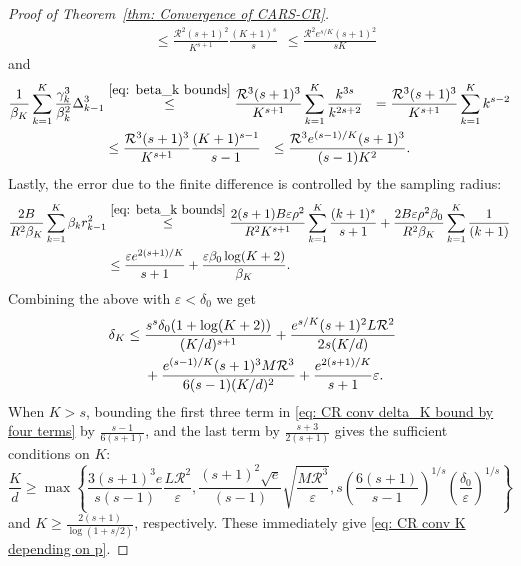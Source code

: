 \begin{proof}[Proof of Theorem~\ref{thm: Convergence of CARS-CR}]
\begin{align*}
         & \leq \frac{\mathcal{R}^2(s+1)^2}{K^{s+1}} \frac{(K+1)^s}{s}
        ~~\leq \frac{\mathcal{R}^2e^{s/K} (s+1)^2}{sK}
    \end{align*}
    and
    \begin{align*}
        \frac{1}{\beta_K}\sum_{k=1}^{K}\frac{\gamma_k^3}{\beta_k^2}\Delta_{k-1}^3
         & \stackrel{\eqref{eq: beta_k bounds}}{\leq} \frac{\mathcal{R}^3(s+1)^3}{K^{s+1}} \sum_{k=1}^{K}\frac{k^{3s}}{k^{2s+2}}
        ~~= \frac{\mathcal{R}^3(s+1)^3}{K^{s+1}} \sum_{k=1}^{K} k^{s-2}                                                                \\
         & \leq \frac{\mathcal{R}^3(s+1)^3}{K^{s+1}} \frac{(K+1)^{s-1}}{s-1} ~~\leq \frac{\mathcal{R}^3e^{(s-1)/K} (s+1)^3}{(s-1)K^2}.
    \end{align*}
    Lastly, the error due to the finite difference is controlled by the sampling radius:
    \begin{align*}
        \frac{2B}{R^2 \beta_K}\sum_{k=1}^{K}\beta_{k} r_{k-1}^2
         & \stackrel{\eqref{eq: beta_k bounds}}{\leq} \frac{2(s+1) B\varepsilon \rho^2}{R^2 K^{s+1}} \sum_{k=1}^{K}\frac{(k+1)^{s}}{s+1} + \frac{2B\varepsilon \rho^2 \beta_0}{R^2 \beta_K}\sum_{k=1}^{K} \frac{1}{(k+1)} \\
         & \leq \frac{\varepsilon e^{2(s+1)/K}}{s+1} + \frac{\varepsilon \beta_0 \log(K+2)}{\beta_K}.
    \end{align*}
    Combining the above with $\varepsilon < \delta_0$ we get
    \begin{align}\label{eq: CR conv delta_K bound by four terms}
        \delta_K & \leq \frac{ s^s \delta_0 (1+ \log(K+2)) }{(K/d)^{s+1}}
        + \frac{e^{s/K} (s+1)^2 L\mathcal{R}^2  }{2s(K/d)} \cr
                 & \quad~ + \frac{e^{(s-1)/K} (s+1)^3 M \mathcal{R}^3  }{6(s-1)(K/d)^2}
        + \frac{e^{2(s+1)/K} }{s+1}\varepsilon .
    \end{align}
    When $K>s$, bounding the first three term in \eqref{eq: CR conv delta_K bound by four terms} by $\frac{s-1}{6(s+1)}$, and the last term by $\frac{s+3}{2(s+1)}$ gives the sufficient conditions on $K$:
    \begin{equation*}
        \frac{K}{d} \geq \max\left\{
        \frac{3(s+1)^3 e}{s(s-1)}\frac{L\mathcal{R}^2}{\varepsilon},
        \frac{(s+1)^2 \sqrt{e}}{(s-1)} \sqrt{\frac{M\mathcal{R}^3}{\varepsilon}},
        s\left(\frac{6(s+1)}{s-1}\right)^{1/s} \left(\frac{\delta_0}{\varepsilon}\right)^{1/s}
        \right\}
    \end{equation*}
    and $K \geq \frac{2(s+1)}{\log(1+s/2)}$, respectively.
    These immediately give \eqref{eq: CR conv K depending on p}.
\end{proof}

